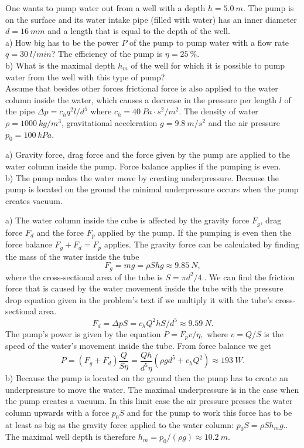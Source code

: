 One wants to pump water out from a well with a depth $h=\SI{5.0}{m}$. The pump is on the surface and its water intake pipe (filled with water) has an inner diameter $d=\SI{16}{mm}$ and a length that is equal to the depth of the well.\\
a) How big has to be the power $P$ of the pump to pump water with a flow rate $q=\SI{30}{l/min}$? The efficiency of the pump is $\eta=\SI{25}{\percent}$.\\
b) What is the maximal depth $h_{m}$ of the well for which it is possible to pump water from the well with this type of pump?\\
Assume that besides other forces frictional force is also applied to the water column inside the water, which causes a decrease in the pressure per length $l$ of the pipe $\Delta p=c_{h}q^{2}l/d^{5}$ where $c_{h}=\SI{40}{Pa\cdot s^{2}/m^{2}}$. The density of water $\rho=\SI{1000}{kg/m^{3}}$, gravitational acceleration $g=\SI{9.8}{m/s^{2}}$ and the air pressure $p_{0}=\SI{100}{kPa}$.

\hinteng
a) Gravity force, drag force and the force given by the pump are applied to the water column inside the pump. Force balance applies if the pumping is even.\\ 
b) The pump makes the water move by creating underpressure. Because the pump is located on the ground the minimal underpressure occurs when the pump creates vacuum.

\solueng
a) The water column inside the cube is affected by the gravity force $F_{g}$, drag force $F_{d}$ and the force $F_{p}$ applied by the pump. If the pumping is even then the force balance $F_{g}+F_{d}=F_{p}$ applies. The gravity force can be calculated by finding the mass of the water inside the tube
\[
F_{g}=mg=\rho Shg\approx\SI{9.85}{N},
\]
where the cross-sectional area of the tube is $S=\pi d^{2}/4.$. We can find the friction force that is caused by the water movement inside the tube with the pressure drop equation given in the problem’s text if we multiply it with the tube’s cross-sectional area. 
\[
F_{d}=\Delta pS=c_{h}Q^{2}hS/d^{5}\approx\SI{9.59}{N}.
\]
The pump’s power is given by the equation $P=F_{p}v/\eta,$ where $v=Q/S$ is the speed of the water’s movement inside the tube. From force balance we get
\[
P=\left(F_{g}+F_{d}\right)\frac{Q}{S\eta}=\frac{Qh}{d^{5}\eta}\left(\rho gd^{5}+c_{h}Q^{2}\right)\approx\SI{193}{W}.
\]
b) Because the pump is located on the ground then the pump has to create an underpressure to move the water. The maximal underpressure is in the case when the pump creates a vacuum. In this limit case the air pressure presses the water column upwards with a force $p_{0}S$ and for the pump to work this force has to be at least as big as the gravity force applied to the water column: $p_{0}S=\rho Sh_{m}g.$. The maximal well depth is therefore $h_{m}=p_{0}/\left(\rho g\right)\approx\SI{10.2}{m}$.
\probend